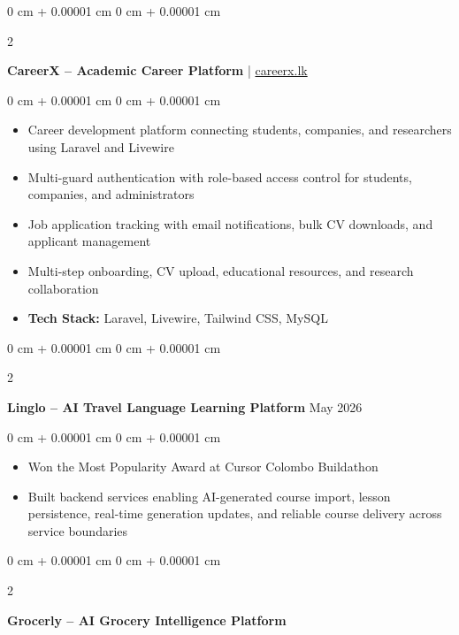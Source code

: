 \documentclass[10pt, letterpaper]{article}
\newenvironment{highlights}{
    \begin{itemize}[
        topsep=0.10 cm,
        parsep=0.10 cm,
        partopsep=0pt,
        itemsep=0pt,
        leftmargin=0 cm + 10pt
    ]
}{
    \end{itemize}
} %
\newenvironment{onecolentry}{
    \begin{adjustwidth}{
        0 cm + 0.00001 cm
    }{
        0 cm + 0.00001 cm
    }
}{
    \end{adjustwidth}
} %
\newenvironment{twocolentry}[2][]{
    \onecolentry
    \def\secondColumn{#2}
    \setcolumnwidth{\fill, 4.5 cm}
    \begin{paracol}{2}
}{
    \switchcolumn \raggedleft \secondColumn
    \end{paracol}
    \endonecolentry
} %
\let\hrefWithoutArrow\href
\begin{document}
        \vspace{0.30 cm}
        \begin{twocolentry}{
            2026
        }
            \textbf{CareerX – Academic Career Platform} | \hrefWithoutArrow{https://careerx.lk}{careerx.lk}\end{twocolentry}

        \vspace{0.10 cm}
        \begin{onecolentry}
            \begin{highlights}
                \item Career development platform connecting students, companies, and researchers using Laravel and Livewire
                \item Multi-guard authentication with role-based access control for students, companies, and administrators
                \item Job application tracking with email notifications, bulk CV downloads, and applicant management
                \item Multi-step onboarding, CV upload, educational resources, and research collaboration
                \item \textbf{Tech Stack:} Laravel, Livewire, Tailwind CSS, MySQL
            \end{highlights}
        \end{onecolentry}

        \vspace{0.30 cm}
        \begin{twocolentry}{
            May 2026
        }
            \textbf{Linglo – AI Travel Language Learning Platform}\end{twocolentry}

        \vspace{0.10 cm}
        \begin{onecolentry}
            \begin{highlights}
                \item Won the Most Popularity Award at Cursor Colombo Buildathon
                \item Built backend services enabling AI-generated course import, lesson persistence, real-time generation updates, and reliable course delivery across service boundaries
            \end{highlights}
        \end{onecolentry}

        \vspace{0.30 cm}
        \begin{twocolentry}{
            2026
        }
            \textbf{Grocerly – AI Grocery Intelligence Platform}\end{twocolentry}
\end{document}
